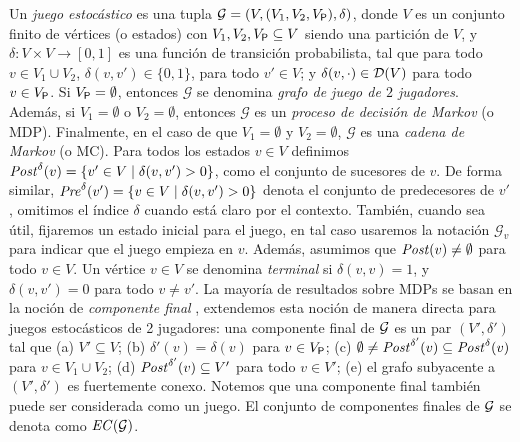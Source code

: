 Un \emph{juego estocástico} \cite{ChatterjeeH12,SvorenovaKwiatkowska16} es una tupla $\mathcal{G} = ( V,  (V_1, V_2, V_{\mathsf{P}}), \delta  ) $, donde $V$ es un conjunto finito de vértices (o estados) con $V_1, V_2, V_{\mathsf{P}} \subseteq V$ siendo una partición de $V$, y $\delta : V \times V \rightarrow [0,1]$ es una función de transición probabilista, tal que para todo $v \in V_1\cup V_2$, $\delta(v,v') \in  \{0,1\}$, para todo $v' \in V$; y $\delta(v,\cdot) \in \mathcal{D}(V)$ para todo $v \in V_{\mathsf{P}}$.
Si $V_{\mathsf{P}} = \emptyset$, entonces $\mathcal{G}$ se denomina \emph{grafo de juego de $2$ jugadores}. Además, si $V_1 = \emptyset$ o $V_2 = \emptyset$, entonces $\mathcal{G}$ es un \emph{proceso de decisión de Markov} (o MDP). Finalmente, en el caso de que $V_1= \emptyset$ y $V_2 = \emptyset$, $\mathcal{G}$ es una \emph{cadena de Markov} (o MC). Para todos los estados $v \in V$ definimos $\mathit{Post}^\delta(v) = \{v' \in V \mid \delta(v,v')>0 \}$, como el conjunto de sucesores de $v$. De forma similar, $\mathit{Pre}^\delta(v') = \{v \in V \mid \delta(v,v')>0 \}$ denota el conjunto de predecesores de $v'$, omitimos el índice $\delta$ cuando está claro por el contexto. También, cuando sea útil, fijaremos un estado inicial para el juego, en tal caso usaremos la notación $\mathcal{G}_v$ para indicar que el juego empieza en $v$. Además, asumimos que $\mathit{Post}(v) \neq \emptyset$ para todo
$v \in V$.
Un vértice $v \in V$ se denomina \emph{terminal} si $\delta(v,v) = 1$, y $\delta(v,v')=0$ para todo $v \neq v'$.
La mayoría de resultados sobre MDPs se basan en la noción de \emph{componente final} \cite{BaierK08}, extendemos esta noción de manera directa para juegos estocásticos de 2 jugadores: una componente final de $\mathcal{G}$ es un par $(V',\delta')$ tal que (a) $V' \subseteq V$; (b) $\delta'(v) = \delta(v)$ para $v \in V_{\mathsf{P}}$; (c) $\emptyset \neq \mathit{Post}^{\delta'}(v) \subseteq \mathit{Post}^\delta(v)$ para $v \in V_1 \cup V_2$; (d) $\mathit{Post}^{\delta'}(v) \subseteq V'$ para todo $v \in V'$; (e) el grafo subyacente a $(V',\delta')$ es fuertemente conexo.  Notemos que una componente final también puede ser considerada como un juego. El conjunto de componentes finales de $\mathcal{G}$ se denota como $\mathit{EC}(\mathcal{G})$.
 
